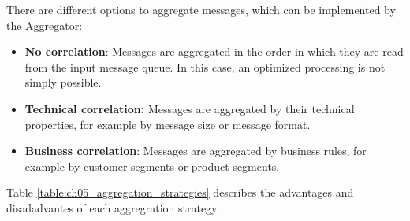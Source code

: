 There are different options to aggregate messages, which can be implemented by the Aggregator:

\begin{itemize}
	\item \textbf{No correlation}: Messages are aggregated in the order in which they are read from the input message queue. In this case, an optimized processing is not simply possible.
	\item \textbf{Technical correlation:} Messages are aggregated by their technical properties, for example by message size or message format.
	\item \textbf{Business correlation}: Messages are aggregated by business rules, for example by customer segments or product segments.
\end{itemize}

Table \ref{table:ch05_aggregation_strategies} describes the advantages and disadadvantes of each aggregration strategy.

